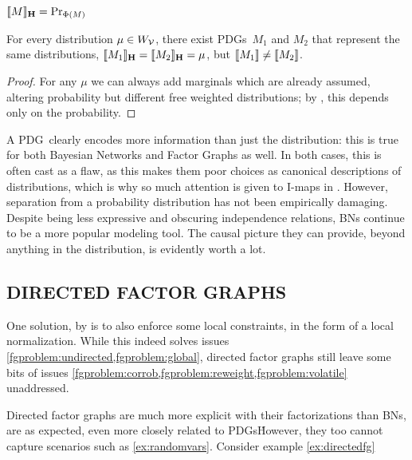 \documentclass{article}
\newcommand\MaxEnt{_{\mathbf H}}
\newcommand{\MN}{PDG}
\newcommand{\MNs}{\MN s}
\numberwithin{equation}{section}
\begin{document}
\begin{notfocus}
	
	
	\begin{conj}\label{thm:noninj}
		$\bbr{M}\MaxEnt = \Pr_{\Phi(M)}$
	\end{conj}
	\begin{coro}\label{coro:same-dist;different-weight}
		For every distribution $\mu \in W_{\cal V}$, there exist \MNs\ $M_1$ and $M_2$ that represent the same distributions, $\bbr{M_1}\MaxEnt=\bbr{M_2}\MaxEnt=\mu$, but $\llbracket M_1\rrbracket \neq \llbracket M_2\rrbracket$. 
	\end{coro}
	\begin{proof}
		For any $\mu$ we can always add marginals which are already assumed, altering probability but different free weighted distributions; by , this depends only on the probability.
	\end{proof}
	
	A \MN\ clearly encodes more information than just the distribution: this is true for both Bayesian Networks and Factor Graphs as well. In both cases, this is often cast as a flaw, as this makes them poor choices as canonical descriptions of distributions, which is why so much attention is given to I-maps in \parencite{koller2009probabilistic}. However, separation from a probability distribution has not been empirically damaging. Despite being less expressive and obscuring independence relations, BNs continue to be a more popular modeling tool. The causal picture they can provide, beyond anything in the distribution, is evidently worth a lot.




	\subsection{DIRECTED FACTOR GRAPHS}
	
	One solution, by \parencite{frey2012extending} is to also enforce some local constraints, in the form of a local normalization.  While this indeed solves issues \cref{fgproblem:undirected,fgproblem:global}, directed factor graphs still leave some bits of issues \cref{fgproblem:corrob,fgproblem:reweight,fgproblem:volatile} unaddressed.
	
	Directed factor graphs are much more explicit with their factorizations than BNs, are as expected, even more closely related to \MNs\. However, they too cannot capture scenarios such as \cref{ex:randomvars}. Consider example \ref{ex:directedfg}
	
	\begin{example}\label{ex:directedfg}
	\end{example}


\end{notfocus}
\end{document}
